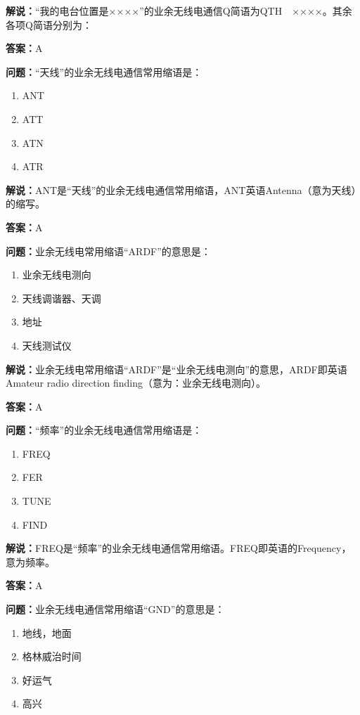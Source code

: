 \textbf{解说：}“我的电台位置是××××”的业余无线电通信Q简语为QTH　××××。其余各项Q简语分别为：

\textbf{答案：}A

\textbf{问题：}“天线”的业余无线电通信常用缩语是：

\begin{enumerate}[label=\Alph*), leftmargin=3em]
	\item ANT
	\item ATT
	\item ATN
	\item ATR
\end{enumerate}

\textbf{解说：}ANT是“天线”的业余无线电通信常用缩语，ANT英语Antenna（意为天线）的缩写。

\textbf{答案：}A

\textbf{问题：}业余无线电常用缩语“ARDF”的意思是：

\begin{enumerate}[label=\Alph*), leftmargin=3em]
	\item 业余无线电测向
	\item 天线调谐器、天调
	\item 地址
	\item 天线测试仪
\end{enumerate}

\textbf{解说：}业余无线电常用缩语“ARDF”是“业余无线电测向”的意思，ARDF即英语Amateur radio direction finding（意为：业余无线电测向）。

\textbf{答案：}A

\textbf{问题：}“频率”的业余无线电通信常用缩语是：
\begin{enumerate}[label=\Alph*), leftmargin=3em]
	\item FREQ
	\item FER
	\item TUNE
	\item FIND
\end{enumerate}

\textbf{解说：}FREQ是“频率”的业余无线电通信常用缩语。FREQ即英语的Frequency，意为频率。

\textbf{答案：}A

\textbf{问题：}业余无线电通信常用缩语“GND”的意思是：

\begin{enumerate}[label=\Alph*), leftmargin=3em]
	\item 地线，地面
	\item 格林威治时间
	\item 好运气
	\item 高兴
\end{enumerate}

